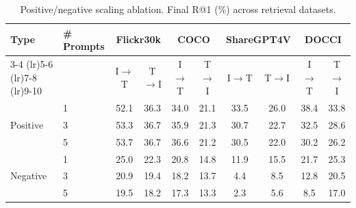 \begin{table}[t]
\centering
\caption{Positive/negative scaling ablation. Final R@1 (\%) across retrieval datasets.}
\label{tab:pos_neg_scaling}
\small
\setlength{\tabcolsep}{4pt}
\begin{tabular}{llcccccccc}
\toprule
\textbf{Type} & \textbf{\# Prompts} & \multicolumn{2}{c}{Flickr30k} & \multicolumn{2}{c}{COCO} & \multicolumn{2}{c}{ShareGPT4V} & \multicolumn{2}{c}{DOCCI} \\
\cmidrule(lr){3-4}
\cmidrule(lr){5-6}
\cmidrule(lr){7-8}
\cmidrule(lr){9-10}
 &  & I$\to$T & T$\to$I & I$\to$T & T$\to$I & I$\to$T & T$\to$I & I$\to$T & T$\to$I \\
\midrule
\multirow{3}{*}{Positive} & 1 & 52.1 & 36.3 & 34.0 & 21.1 & 33.5 & 26.0 & 38.4 & 33.8 \\
 & 3 & 53.3 & 36.7 & 35.9 & 21.3 & 30.7 & 22.7 & 32.5 & 28.6 \\
 & 5 & 53.7 & 36.7 & 36.6 & 21.2 & 30.5 & 22.0 & 30.2 & 26.2 \\
\midrule
\multirow{3}{*}{Negative} & 1 & 25.0 & 22.3 & 20.8 & 14.8 & 11.9 & 15.5 & 21.7 & 25.3 \\
 & 3 & 20.9 & 19.4 & 18.2 & 13.7 & 4.4 & 8.5 & 12.8 & 20.5 \\
 & 5 & 19.5 & 18.2 & 17.3 & 13.3 & 2.3 & 5.6 & 8.5 & 17.0 \\
\bottomrule
\end{tabular}
\end{table}
